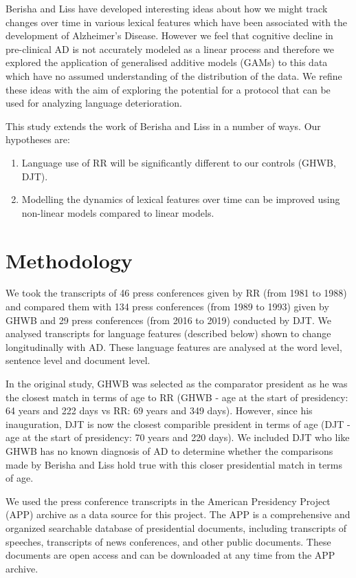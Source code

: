 \documentclass[12pt]{article}
\begin{document}
\par
Berisha and Liss have developed interesting ideas about how we might track changes over time in various lexical features which have been associated with the development of Alzheimer's Disease. However we feel that cognitive decline in pre-clinical AD is not accurately modeled as a linear process and therefore we explored the application of generalised additive models (GAMs) to this data which have no assumed understanding of the distribution of the data. We refine these ideas with the aim of exploring the potential for a protocol that can be used for analyzing language deterioration. 


This study extends the work of Berisha and Liss in a number of ways. Our hypotheses are:
\begin{enumerate}
	\item Language use of RR will be significantly different to our controls (GHWB, DJT).
	\item Modelling the dynamics of lexical features over time can be improved using non-linear models compared to linear models.
\end{enumerate}

\section{Methodology}\label{methodology}
We took the transcripts of 46 press conferences given by RR (from 1981 to 1988) and compared them with 134 press conferences (from 1989 to 1993) given by GHWB and 29 press conferences (from 2016 to 2019) conducted by DJT.  We analysed transcripts for language features (described below) shown to change longitudinally with AD. These language features are analysed at the word level, sentence level and document level. 
\par 
In the original study, GHWB was selected as the comparator president as he was the closest match in terms of age to RR (GHWB - age at the start of presidency: 64 years and 222 days vs RR: 69 years and 349 days). However, since his inauguration, DJT is now the closest comparible president in terms of age (DJT - age at the start of presidency: 70 years and 220 days). We included DJT who like GHWB has no known diagnosis of AD to determine whether the comparisons made by Berisha and Liss hold true with this closer presidential match in terms of age. 
\par 
We used the press conference transcripts in the American Presidency Project (APP) archive as a data source for this project. The APP is a comprehensive and organized searchable database of presidential documents, including transcripts of speeches, transcripts of news conferences, and other public documents. These documents are open access and can be downloaded at any time from the APP archive.
\end{document}
